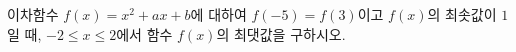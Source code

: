 이차함수 $f(x)=x^2+ax+b$에 대하여 $f(-5)=f(3)$이고 $f(x)$의 최솟값이 $1$일 때, $-2\le x\le 2$에서 함수 $f(x)$의 최댓값을 구하시오. 
